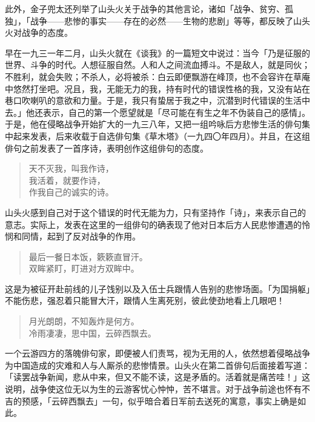 {此外，金子兜太还列举了山头火关于战争的其他言论，诸如「战争、贫穷、孤独」，「战争——悲惨的事实——存在的必然——生物的悲剧」等等，都反映了山头火对战争的态度。

早在一九三一年二月，山头火就在《谈我》\footnotemark[12] 的一篇短文中说过：当今「乃是征服的世界、斗争的时代。人想征服自然。人和人之间流血搏斗。不是敌人，就是同伙；不胜利，就会失败；不杀人，必将被杀：白云即便飘游在峰顶，也不会容许在草庵中悠然打坐吧。况且，我，无能无力的我，持有时代的错误性格的我，又没有站在巷口吹喇叭的意欲和力量。于是，我只有蛰居于我之中，沉潜到时代错误的生活中去。」他还表示，自己的第一个愿望就是「尽可能在有生之年不伪装自己的感情」。于是，他在侵略战争开始扩大的一九三八年，又把一组吟咏后方悲惨生活的俳句集中起来发表，后来收载于自选俳句集《草木塔》（一九四〇年四月）。并且，在这组俳句之前发表了一首序诗，表明创作这组俳句的态度。


\begin{quote}
    天不灭我，叫我作诗，\\
    我活着，就要作诗，\\
    作我自己的诚实的诗。
\end{quote}

山头火感到自己对于这个错误的时代无能为力，只有坚持作「诗」，来表示自己的意志。实际上，发表在这里的一组俳句的确表现了他对日本后方人民悲惨遭遇的怜悯和同情，起到了反对战争的作用。
\begin{quote}
    最后一餐日本饭，簌簌直冒汗。\\
    双眸紧盯，盯进对方双眸中。
\end{quote}

这是为被征开赴前线的儿子饯别以及入伍士兵跟情人告别的悲惨场面。「为国捐躯」不能伤悲，强忍着只能冒大汗，跟情人生离死别，彼此使劲地看上几眼吧！

\begin{quote}
    月光朗朗，不知轰炸是何方。\\
    冷雨凄凄，思中国，云碎西飘去。
\end{quote}

一个云游四方的落魄俳句家，即便被人们责骂，视为无用的人，依然想着侵略战争为中国造成的灾难和人与人厮杀的悲惨情景。山头火在第二首俳句后面接着写道：「读罢战争新闻，悲从中来，但又不能不读，这是矛盾的。活着就是痛苦哇！」这说明，战争使这位无以为生的云游客忧心忡忡，苦不堪言。对于战争前途也怀有不吉的预感，「云碎西飘去」一句，似乎暗合着日军前去送死的寓意，事实上确是如此。

}

